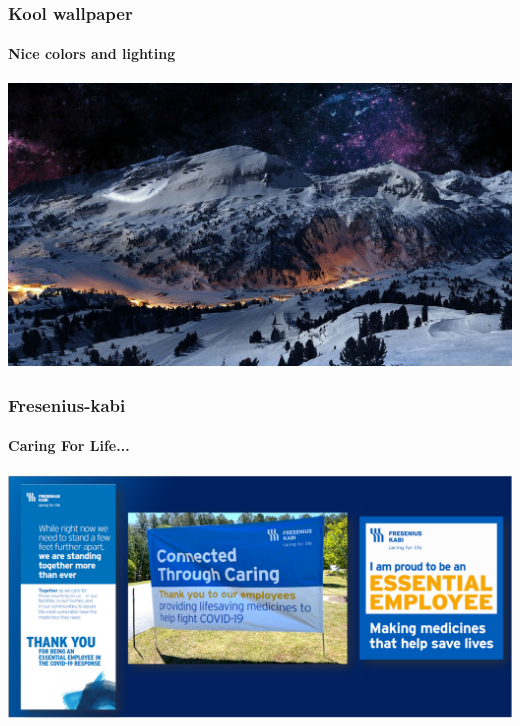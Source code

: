 \documentclass{beamer}
\begin{document}
\begin{frame}
  \frametitle{\hspace{4mm}Kool wallpaper}%
  \framesubtitle{\hspace{4mm}Nice colors and lighting}%
  \includegraphics[scale=.16]{images/cid-03.png}%
\end{frame}%

\begin{frame}
  \frametitle{\hspace{4mm}Fresenius-kabi}%
  \framesubtitle{\hspace{4mm}Caring For Life...}%
  \includegraphics[scale=.38]{images/cid-04.png}%
\end{frame}%

\end{document}
